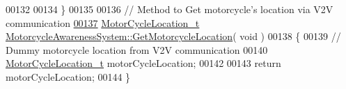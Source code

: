 \begin{DoxyCode}
00132 
00134 \}
00135 
00136 \textcolor{comment}{// Method to Get motorcycle's location via V2V communication}
\hypertarget{MotorcycleAwarenessSystem_8cpp_source_l00137}{}\hyperlink{classMotorcycleAwarenessSystem_a840a5bc17d75276ecdb3a39d7aaf4109}{00137} \hyperlink{structMotorCycleLocation__t}{MotorCycleLocation\_t} 
      \hyperlink{classMotorcycleAwarenessSystem_a840a5bc17d75276ecdb3a39d7aaf4109}{MotorcycleAwarenessSystem::GetMotorcycleLocation}( \textcolor{keywordtype}{void} )
00138 \{
00139     \textcolor{comment}{// Dummy motorcycle location from V2V communication}
00140     \hyperlink{structMotorCycleLocation__t}{MotorCycleLocation\_t} motorCycleLocation;
00142 
00143     \textcolor{keywordflow}{return} motorCycleLocation;
00144 \}
\end{DoxyCode}
